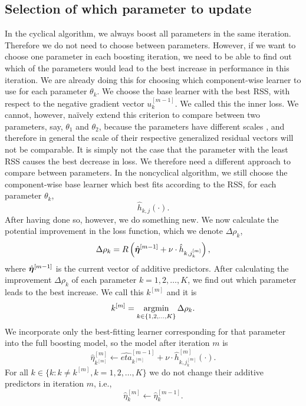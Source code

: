 \subsection{Selection of which parameter to update}
In the cyclical algorithm, we always boost all parameters in the same iteration.
Therefore we do not need to choose between parameters.
However, if we want to choose one parameter in each boosting iteration, we need to be able to find out which of the parameters would lead to the best increase in performance in this iteration.
We are already doing this for choosing which component-wise learner to use for each parameter $\theta_k$.
We choose the base learner with the best RSS, with respect to the negative gradient vector $u_k^{[m-1]}$.
We called this the inner loss.
We cannot, however, naïvely extend this criterion to compare between two parameters, say, $\theta_1$ and $\theta_2$, because the parameters have different scales \citep{thomas2018}, and therefore in general the scale of their respective generalized residual vectors will not be comparable.
It is simply not the case that the parameter with the least RSS causes the best decrease in loss.
We therefore need a different approach to compare between parameters.
In the noncyclical algorithm, we still choose the component-wise base learner which best fits according to the RSS, for each parameter $\theta_k$,
\begin{equation*}
    \hat{h}_{k,j}(\cdot).
\end{equation*}
After having done so, however, we do something new.
We now calculate the potential improvement in the loss function, which we denote $\Delta\rho_{k}$,
\begin{equation*}
    \Delta\rho_{k}=R\left(\hat{\boldsymbol{\eta}}^{[m-1]}+\nu\cdot\hat{h}_{k,j_{k}^{[m]}}\right),
\end{equation*}
where $\hat{\boldsymbol{\eta}}^{[m-1]}$ is the current vector of additive predictors.
After calculating the improvement $\Delta\rho_{k}$ of each parameter $k=1,2,\ldots,K$, we find out which parameter leads to the best increase.
We call this $k^{[m]}$ and it is
\begin{equation*}
    k^{[m]}=\operatorname*{argmin}_{k\in\{1,2,\ldots,K\}}\Delta\rho_{k}.
\end{equation*}
We incorporate only the best-fitting learner corresponding for that parameter into the full boosting model, so the model after iteration $m$ is
\begin{equation*}
    \hat{\eta}^{[m]}_{k^{[m]}}\gets \hat{eta}_{k^{[m]}}^{[m-1]}+\nu\cdot\hat{h}^{[m]}_{k,j_k^{[m]}}(\cdot).
\end{equation*}
For all $k\in\{k\colon k\neq k^{[m]}, k=1,2,\ldots,K\}$ we do not change their additive predictors in iteration $m$, i.e.,
\begin{equation*}
    \hat{\eta}_{k}^{[m]}\gets\hat{\eta}_{k}^{[m-1]}.
\end{equation*}

